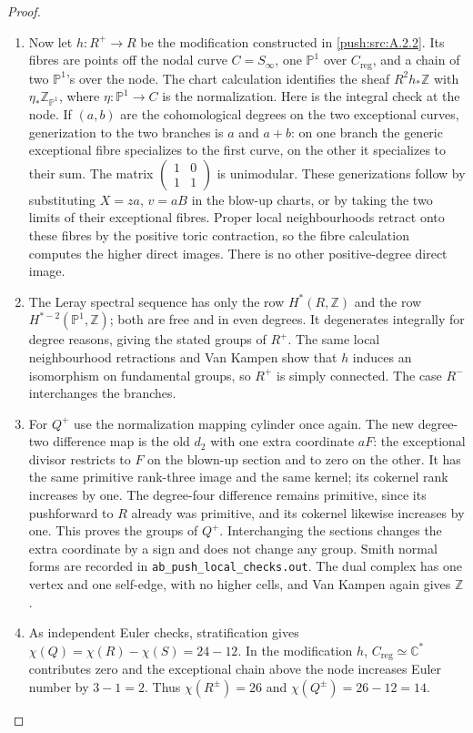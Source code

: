 \begin{proof}
\begin{enumerate}[label=\arabic*.,leftmargin=*]
\item Now let $h:R^+\to R$ be the modification constructed in \ref{push:src:A.2.2}.
Its fibres are points off the nodal curve $C=S_\infty$, one
$\mathbb P^1$ over $C_{\mathrm{reg}}$, and a chain of two
$\mathbb P^1$'s over the node. The chart calculation identifies
the sheaf $R^2h_*\mathbb Z$ with
$\eta_*\mathbb Z_{\mathbb P^1}$, where
$\eta:\mathbb P^1\to C$ is the normalization. Here is the
integral check at the node. If $(a,b)$ are the cohomological
degrees on the two exceptional curves, generization to the
two branches is $a$ and $a+b$: on one branch the generic
exceptional fibre specializes to the first curve, on the
other it specializes to their sum. The matrix
$\left(\begin{smallmatrix}1&0\\1&1\end{smallmatrix}\right)$
is unimodular. These generizations follow by substituting
$X=za$, $v=aB$ in the blow-up charts, or by taking the two
limits of their exceptional fibres. Proper local neighbourhoods
retract onto these fibres by the positive toric contraction,
so the fibre calculation computes the higher direct images.
There is no other positive-degree direct image.

\item The Leray spectral sequence has only the row $H^*(R,\mathbb Z)$
and the row $H^{*-2}(\mathbb P^1,\mathbb Z)$; both are free
and in even degrees. It degenerates integrally for degree
reasons, giving the stated groups of $R^+$. The same local
neighbourhood retractions and Van Kampen show that $h$ induces
an isomorphism on fundamental groups, so $R^+$ is simply
connected. The case $R^-$ interchanges the branches.

\item For $Q^+$ use the normalization mapping cylinder once again.
The new degree-two difference map is the old $d_2$ with
one extra coordinate $aF$: the exceptional divisor restricts
to $F$ on the blown-up section and to zero on the other.
It has the same primitive rank-three image and the same
kernel; its cokernel rank increases by one. The degree-four
difference remains primitive, since its pushforward to $R$
already was primitive, and its cokernel likewise increases
by one. This proves the groups of $Q^+$. Interchanging the
sections changes the extra coordinate by a sign and does
not change any group. Smith normal forms are recorded in
\texttt{ab\_push\_local\_checks.out}. The dual complex has
one vertex and one self-edge, with no higher cells, and
Van Kampen again gives $\mathbb Z$.

\item As independent Euler checks, stratification gives
$\chi(Q)=\chi(R)-\chi(S)=24-12$. In the modification $h$,
$C_{\mathrm{reg}}\simeq\mathbb C^*$ contributes zero and
the exceptional chain above the node increases Euler number
by $3-1=2$. Thus $\chi(R^\pm)=26$ and
$\chi(Q^\pm)=26-12=14$.
\end{enumerate}
\end{proof}

